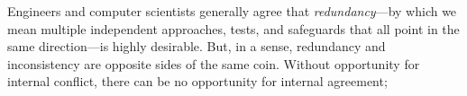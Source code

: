 
Engineers and computer scientists generally agree that \emph{redundancy}---by which we mean multiple independent approaches, tests, and safeguards that all point in the same direction---is highly desirable. 
But, in a sense, redundancy and inconsistency are opposite sides of the same coin. 
Without opportunity for internal conflict, there can be no opportunity for internal agreement; 


